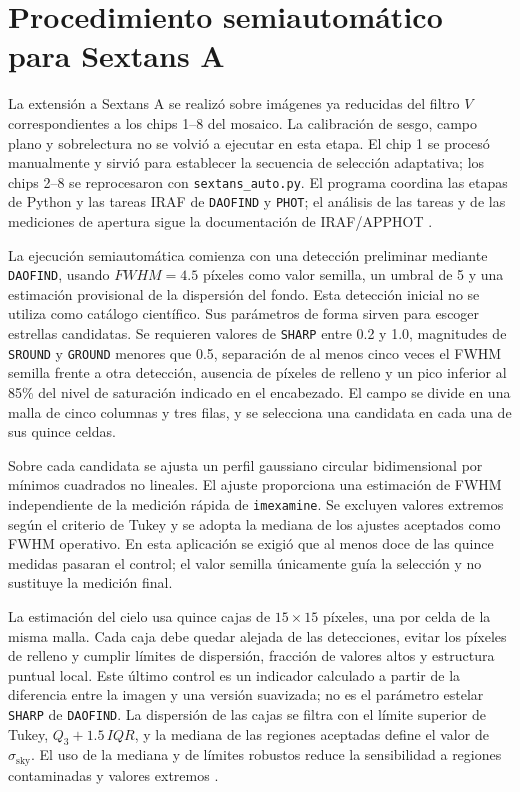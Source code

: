 \documentclass[12pt,letterpaper,oneside]{book}
\begin{document}
\section{Procedimiento semiautomático para Sextans A}
\label{sec:metodo-sextans-auto}

La extensión a Sextans A se realizó sobre imágenes ya reducidas del filtro $V$ correspondientes a los chips 1--8 del mosaico. La calibración de sesgo, campo plano y sobrelectura no se volvió a ejecutar en esta etapa. El chip 1 se procesó manualmente y sirvió para establecer la secuencia de selección adaptativa; los chips 2--8 se reprocesaron con \texttt{sextans\_auto.py}. El programa coordina las etapas de Python y las tareas IRAF de \texttt{DAOFIND} y \texttt{PHOT}; el análisis de las tareas y de las mediciones de apertura sigue la documentación de IRAF/APPHOT \citep{irafdaofind2026,irafapphot2026}.

La ejecución semiautomática comienza con una detección preliminar mediante \texttt{DAOFIND}, usando $FWHM=4.5$ píxeles como valor semilla, un umbral de 5 y una estimación provisional de la dispersión del fondo. Esta detección inicial no se utiliza como catálogo científico. Sus parámetros de forma sirven para escoger estrellas candidatas. Se requieren valores de \texttt{SHARP} entre 0.2 y 1.0, magnitudes de \texttt{SROUND} y \texttt{GROUND} menores que 0.5, separación de al menos cinco veces el FWHM semilla frente a otra detección, ausencia de píxeles de relleno y un pico inferior al 85\% del nivel de saturación indicado en el encabezado. El campo se divide en una malla de cinco columnas y tres filas, y se selecciona una candidata en cada una de sus quince celdas.

Sobre cada candidata se ajusta un perfil gaussiano circular bidimensional por mínimos cuadrados no lineales. El ajuste proporciona una estimación de FWHM independiente de la medición rápida de \texttt{imexamine}. Se excluyen valores extremos según el criterio de Tukey y se adopta la mediana de los ajustes aceptados como FWHM operativo. En esta aplicación se exigió que al menos doce de las quince medidas pasaran el control; el valor semilla únicamente guía la selección y no sustituye la medición final.

La estimación del cielo usa quince cajas de $15\times15$ píxeles, una por celda de la misma malla. Cada caja debe quedar alejada de las detecciones, evitar los píxeles de relleno y cumplir límites de dispersión, fracción de valores altos y estructura puntual local. Este último control es un indicador calculado a partir de la diferencia entre la imagen y una versión suavizada; no es el parámetro estelar \texttt{SHARP} de \texttt{DAOFIND}. La dispersión de las cajas se filtra con el límite superior de Tukey, $Q_3+1.5\,IQR$, y la mediana de las regiones aceptadas define el valor de $\sigma_{\mathrm{sky}}$. El uso de la mediana y de límites robustos reduce la sensibilidad a regiones contaminadas y valores extremos \citep{tukey1977,beers1990}.
\end{document}
